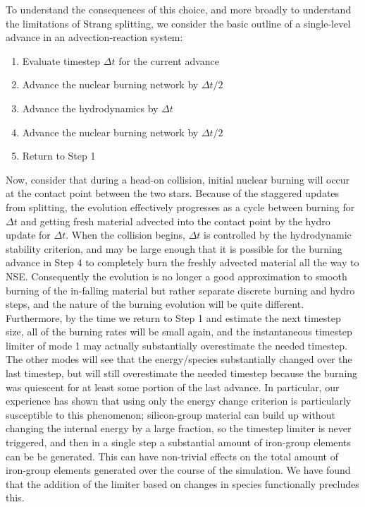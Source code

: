 \documentclass[12pt]{article}
\begin{document}
To understand the consequences of this choice, and more broadly to 
understand the limitations of Strang splitting, we consider the 
basic outline of a single-level advance in an advection-reaction system:
\begin{enumerate}
  \item Evaluate timestep $\Delta t$ for the current advance
  \item Advance the nuclear burning network by $\Delta t / 2$
  \item Advance the hydrodynamics by $\Delta t$
  \item Advance the nuclear burning network by $\Delta t / 2$
  \item Return to Step 1
\end{enumerate}
Now, consider that during a head-on collision, initial nuclear burning 
will occur at the contact point between the two stars. Because of 
the staggered updates from splitting, the evolution effectively progresses 
as a cycle between burning for $\Delta t$ and getting fresh material 
advected into the contact point by the hydro update for $\Delta t$. 
When the collision begins, $\Delta t$ is controlled by the hydrodynamic 
stability criterion, and may be large enough that it is possible for 
the burning advance in Step 4 to completely burn the freshly advected 
material all the way to NSE. Consequently the evolution is no longer 
a good approximation to smooth burning of the in-falling material but
rather separate discrete burning and hydro steps, and the nature of 
the burning evolution will be quite different. Furthermore, by the 
time we return to Step 1 and estimate the next timestep size, all 
of the burning rates will be small again, and the instantaneous 
timestep limiter of mode 1 may actually substantially overestimate 
the needed timestep. The other modes will see that the energy/species  
substantially changed over the last timestep, but will still 
overestimate the needed timestep because the burning was quiescent
for at least some portion of the last advance. In particular, our 
experience has shown that using only the energy change criterion
is particularly susceptible to this phenomenon; silicon-group 
material can build up without changing the internal energy by a 
large fraction, so the timestep limiter is never triggered, and 
then in a single step a substantial amount of iron-group elements 
can be be generated. This can have non-trivial effects on the 
total amount of iron-group elements generated over the course of
the simulation. We have found that the addition of the 
limiter based on changes in species functionally precludes this.
\end{document}
